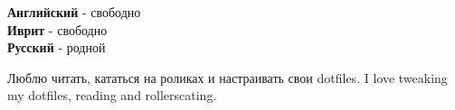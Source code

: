 \documentclass[9pt]{developercv} %
\begin{document}

\begin{minipage}[t]{0.5\textwidth}
	\vspace{-\baselineskip} %

	
	\textbf{Английский} - свободно\\
	\textbf{Иврит} - свободно\\
	\textbf{Русский} - родной\\
\end{minipage}
\hfill
\begin{minipage}[t]{0.5\textwidth}
	\vspace{-\baselineskip} %
	
	
  Люблю читать, кататься на роликах и настраивать свои dotfiles.
  I love tweaking my dotfiles, reading and rollerscating.
	\end{minipage}
\hfill

\end{document}
